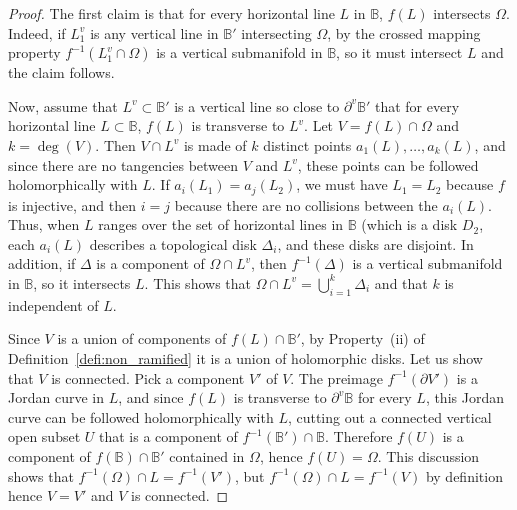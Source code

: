 \documentclass[oneside, 12pt]{amsart}
\newcommand{\fr}{\partial}
\newcommand{\inv}{^{-1}}
\newcommand{\bb}{\mathbb{B}}
\theoremstyle{plain}
\theoremstyle{definition}
\numberwithin{equation}{section}       %
\numberwithin{equation}{section}       %
\begin{document}
\begin{proof}
  The first claim is that for every horizontal line $L$ in $\bb$, 
  $f(L)$ intersects $\Omega$. Indeed, if $L^v_1$ is any vertical line in $\bb'$
   intersecting $\Omega$, by the crossed mapping property 
  $f\inv(L^v_1\cap \Omega)$ is a vertical submanifold in $\bb$, so it must intersect $L$ and the claim follows. 

Now, assume that $L^v\subset \bb'$ is a vertical line so close  to  $\fr^v\bb'$
that for every horizontal line $L\subset \bb$,  $f(L)$ is transverse to $L^v$. 
  Let $V = f(L)\cap \Omega$ and $k =\deg(V)$. Then 
  $V\cap L^v$ is made of $k$ distinct points $a_1(L), \ldots , a_k(L)$, and since there are no tangencies between $V$ and $L^v$, these points can be followed holomorphically with $L$.   
  If $a_i(L_1) = a_j(L_2)$, 
 we must  have $L_1 = L_2$ because $f$ is injective, and then $i = j$ because there are no collisions 
 between the $a_i(L)$. Thus, 
 when $L$ ranges over the set of horizontal lines in $\bb$ (which is a disk $D_2$, each $a_i(L)$ describes a 
 topological disk $\Delta_i$, and these disks are disjoint.
 In addition, if $\Delta$ is a component of $\Omega\cap L^v$, then $f\inv(\Delta)$ is a vertical submanifold in $\bb$, so it intersects $L$. 
 This shows that $\Omega\cap L^v = \bigcup_{i=1}^k \Delta _i$ and   
that $k$ is independent of $L$. 

 

Since $V$ is a union of components of $f(L)\cap \bb'$, by Property~(ii) of Definition~\ref{defi:non_ramified} it is  a union of holomorphic disks. 
Let us show that $V$ is connected.  
Pick a component   $V'$ of $V$. 
The preimage $f\inv(\fr V')$ is a Jordan curve in $L$, and since $f(L)$ is transverse to $\fr^v\bb$ for every $L$, this Jordan curve can be followed holomorphically with $L$, cutting out 
 a connected vertical open subset $U$  that is a component of $f\inv(\bb')\cap \bb$. Therefore 
$f(U)$ is a component of $f(\bb)\cap \bb'$ contained in $\Omega$, hence  $f(U) = \Omega$. 
This discussion shows that $f\inv(\Omega)\cap L = f\inv(V')$, but 
$f\inv(\Omega)\cap L = f\inv(V)$ by definition 
hence $V=V'$ and $V$ is connected. 
 

\end{proof}
\end{document}
